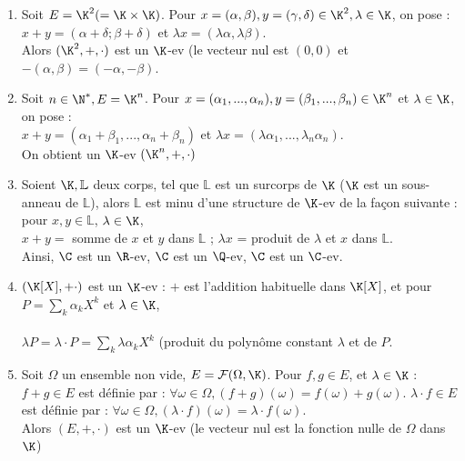 \documentclass[12pt, a4paper]{report}
\begin{document}
\begin{exemple}[Exemples]

\begin{enumerate}

	\item Soit $E = \K^2 (= \K \times \K)$. Pour $x = (\alpha,\beta), y = (\gamma, \delta) \in \K^2, \lambda \in \K$, on pose : \\
	$x+y = (\alpha+\delta;\beta+\delta)$ et $\lambda x = (\lambda \alpha, \lambda \beta)$. \\
	Alors $(\K^2,+,\cdot)$ est un $\K$-ev (le vecteur nul est $(0,0)$ et $-(\alpha, \beta) = (-\alpha, -\beta)$.
	
	\item Soit $n \in \N^*, E = \K^n$. Pour $x = (\alpha_1,...,\alpha_n), y = (\beta_1,...,\beta_n) \in \K^n$ et $\lambda \in \K$, on pose : \\
	$x+y = (\alpha_1 + \beta_1,...,\alpha_n+\beta_n)$ et $\lambda x = (\lambda \alpha_1,...,\lambda_n \alpha_n)$. \\
	On obtient un $\K$-ev $(\K^n,+,\cdot)$
	
	\item Soient $\K, \mathbb{L}$ deux corps, tel que $\mathbb{L}$ est un surcorps de $\K$ (\ie $\K$ est un sous-anneau de $\mathbb{L}$), alors $\mathbb{L}$ est minu d'une structure de $\K$-ev de la façon suivante : pour $x,y \in \mathbb{L}$, $\lambda \in \K$, \\
	$x+y =$ somme de $x$ et $y$ dans $\mathbb{L}$ ;
	$\lambda x$ = produit de $\lambda$ et $x$ dans $\mathbb{L}$. \\
	
	Ainsi, $\C$ est un $\R$-ev, $\C$ est un $\Q$-ev, $\C$ est un $\C$-ev.
	
	\item $(\K[X], + \cdot)$ est un $\K$-ev : $+$ est l'addition habituelle dans $\K[X]$, et pour $P = \displaystyle{\sum_{k} \alpha_k X^k}$ et $\lambda \in \K$,  \\ \\
	$\lambda P = \lambda \cdot P = \displaystyle{\sum_k \lambda \alpha_k X^k}$ (produit du polynôme constant $\lambda$ et de $P$.
	
	\item Soit $\Omega$ un ensemble non vide, $E = \mathcal{F}(\Omega,\K)$. Pour $f,g \in E$, et $\lambda \in \K$ : \\
	$f+g \in E$ est définie par : $\forall \omega \in \Omega, (f+g)(\omega) = f(\omega) + g(\omega)$.
	$\lambda \cdot f \in E$ est définie par : $\forall \omega \in \Omega, (\lambda \cdot f)(\omega) = \lambda \cdot f(\omega)$. \\
	Alors $(E,+,\cdot)$ est un $\K$-ev (le vecteur nul est la fonction nulle de $\Omega$ dans $\K$) \\ 
	

\end{enumerate}
\end{exemple}
\end{document}
